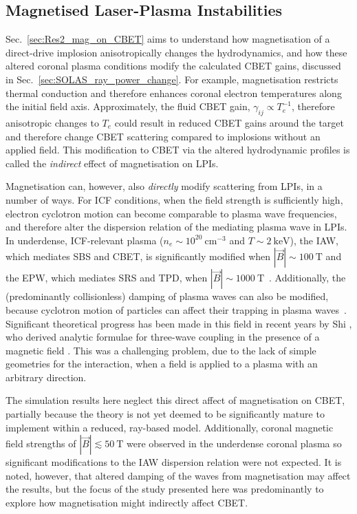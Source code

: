 \subsection{Magnetised Laser-Plasma Instabilities}%
\label{sec:Res2_maglpis}

Sec.~\ref{sec:Res2_mag_on_CBET} aims to understand how magnetisation of a direct-drive implosion anisotropically changes the hydrodynamics, and how these altered coronal plasma conditions modify the calculated \ac{CBET} gains, discussed in Sec.~\ref{sec:SOLAS_ray_power_change}.
For example, magnetisation restricts thermal conduction and therefore enhances coronal electron temperatures along the initial field axis.
Approximately, the fluid \ac{CBET} gain, $\gamma_{ij}\propto T_e^{-1}$, therefore anisotropic changes to $T_e$ could result in reduced \ac{CBET} gains around the target and therefore change \ac{CBET} scattering compared to implosions without an applied field.
This modification to \ac{CBET} via the altered hydrodynamic profiles is called the \textit{indirect} effect of magnetisation on \ac{LPIs}.

Magnetisation can, however, also \textit{directly} modify scattering from \ac{LPIs}, in a number of ways.
For \ac{ICF} conditions, when the field strength is sufficiently high, electron cyclotron motion can become comparable to plasma wave frequencies, and therefore alter the dispersion relation of the mediating plasma wave in \ac{LPIs}.
In underdense, \ac{ICF}-relevant plasma ($n_e \sim 10^{20}\ \text{cm}^{-3}$ and $T\sim2\ \text{keV}$), the \ac{IAW}, which mediates \ac{SBS} and \ac{CBET}, is significantly modified when $|\vec{B}|\sim100\ \text{T}$ and the \ac{EPW}, which mediates \ac{SRS} and \ac{TPD}, when $|\vec{B}|\sim1000\ \text{T}$~\cite{shi_benchmarking_2023}.
Additionally, the (predominantly collisionless) damping of plasma waves can also be modified, because cyclotron motion of particles can affect their trapping in plasma waves~\cite{shi_benchmarking_2023}.
Significant theoretical progress has been made in this field in recent years by Shi , who derived analytic formulae for three-wave coupling in the presence of a magnetic field \cite{shi_threewave_2017,shi_laserplasma_2018}.
This was a challenging problem, due to the lack of simple geometries for the interaction, when a field is applied to a plasma with an arbitrary direction.

The simulation results here neglect this direct affect of magnetisation on \ac{CBET}, partially because the theory is not yet deemed to be significantly mature to implement within a reduced, ray-based model.
Additionally, coronal magnetic field strengths of $|\vec{B}|\lesssim50\ \text{T}$ were observed in the underdense coronal plasma so significant modifications to the \ac{IAW} dispersion relation were not expected.
It is noted, however, that altered damping of the waves from magnetisation may affect the results, but the focus of the study presented here was predominantly to explore how magnetisation might indirectly affect \ac{CBET}.

